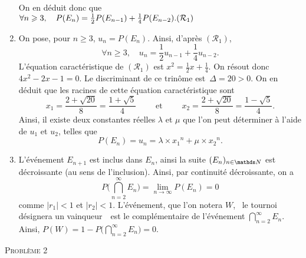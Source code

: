\documentclass[a4paper]{article}
\begin{document}
\begin{enumerate}
			On en déduit donc que\\
			\null\hfill$\forall n \ge 3,\quad P(E_n) = \frac{1}{2}P(E_{n-1}) + \frac{1}{4} P(E_{n-2}).\hfill(\mathcal{R}_1)$
		\item On pose, pour $n \ge 3$, $u_n = P(E_n)$. Ainsi, d'après $(\mathcal{R}_1)$, \[
				\forall n \ge 3,\quad u_n = \frac{1}{2} u_{n-1} + \frac{1}{4} u_{n-2}
			.\]
			L'équation caractéristique de $(\mathcal{R}_1)$\/ est $x^2 = \frac{1}{2} x + \frac{1}{4}$. On résout donc $4x^2 - 2x - 1 = 0$. Le discriminant de ce trinôme est~$\Delta = 20 > 0$. On en déduit que les racines de cette équation caractéristique sont \[
				x_1 = \frac{2 + \sqrt{20}}{8} = \frac{1 + \sqrt{5}}{4} \qquad \text{ et } \qquad x_2 = \frac{2 + \sqrt{20}}{8} = \frac{1 - \sqrt{5}}{4}
			.\] Ainsi, il existe deux constantes réelles $\lambda$\/ et $\mu$\/ que l'on peut déterminer à l'aide de $u_1$\/ et $u_2$, telles que \[
				P(E_n) = u_n = \lambda\times {x_1}^n + \mu\times{x_2}^n
			.\]
		\item L'événement $E_{n+1}$\/ est inclus dans $E_n$, ainsi la suite $(E_n)_{n\in\N}$\/ est décroissante (au sens de l'inclusion). Ainsi, par continuité décroissante, on a \[
				P\Big(\bigcap_{n=2}^\infty E_n\Big) = \lim_{n\to \infty} P(E_n) = 0
			\] comme $|r_1| < 1$\/ et $|r_2| < 1$. L'événement, que l'on notera $W$, \guillemotleft~le tournoi désignera un vainqueur~\guillemotright\ est le complémentaire de l'événement $\bigcap_{n=2}^{\infty} E_n$. Ainsi, $P(W) = 1 - P\big(\bigcap_{n=2}^\infty E_n\big) = 0$.
	\end{enumerate}

	\begin{center}
		\LARGE \textsc{Problème 2}
	\end{center}
\end{document}

